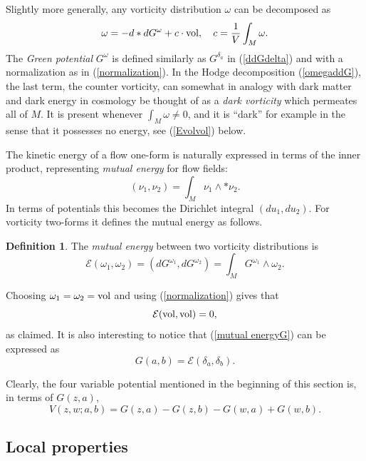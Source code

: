 \documentclass[reqno,12pt]{article}
\theoremstyle{plain}
\theoremstyle{definition}
\newtheorem{definition}{Definition}[section]
\numberwithin{equation}{section}
\numberwithin{figure}{section}
\begin{document}
Slightly more generally, any vorticity distribution $\omega$ can be decomposed as
\begin{equation}\label{omegaddG}
\omega=-d*d G^\omega +c\cdot {\rm vol}, \quad c=\frac{1}{V}\int_M\omega.
\end{equation}
The {\it Green potential} $G^\omega$ is defined similarly as $G^{\delta_a}$ in (\ref{ddGdelta}) and with a normalization as in (\ref{normalization}).
In the Hodge decomposition (\ref{omegaddG}), the last term, the counter vorticity, can somewhat in analogy with dark matter and 
dark energy in cosmology be thought of as  a {\it dark vorticity} which permeates all of $M$. It is present whenever $\int_M \omega\ne 0$,
and it is ``dark'' for example in the sense that it possesses no energy, see (\ref{Evolvol}) below. 

The kinetic energy of a flow one-form is naturally expressed in terms of the inner product, representing {\it mutual energy}
for flow fields:
\begin{equation}\label{mutual energy}
(\nu_1,\nu_2)=\int_M \nu_1\wedge*\nu_2.
\end{equation}
In terms of potentials this becomes the Dirichlet integral $(du_1,du_2)$. For vorticity two-forms it defines the mutual energy as follows.
\begin{definition}\label{def:mutual energy}
The {\it mutual energy} between two vorticity distributions is
$$
\mathcal{E} (\omega_1, \omega_2)=(dG^{\omega_1}, dG^{\omega_2})=\int_M G^{\omega_1}\wedge \omega_2.
$$  
\end{definition}  
Choosing $\omega_1=\omega_2={\rm vol}$ and using (\ref{normalization}) gives that
\begin{equation}\label{Evolvol}
\mathcal{E}({\rm vol}, {\rm vol})=0,
\end{equation}
as claimed. It is also interesting to notice that (\ref{mutual energyG}) can be expressed as
$$
G(a,b)=\mathcal{E}(\delta_a, \delta_b).
$$

Clearly, the four variable potential mentioned in the beginning of this section is, in terms of $G(z,a)$,
\begin{equation}\label{VG}
V(z,w;a,b)=G(z,a)-G(z,b)-G(w,a)+G(w,b).
\end{equation}


\subsection{Local properties}\label{sec:local properties}
\end{document}
